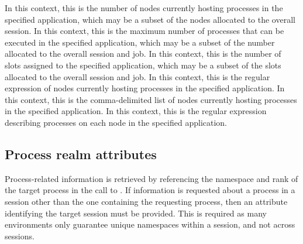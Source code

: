 %
In this context, this is the number of
nodes currently hosting processes in the specified application, which may be a
subset of the nodes allocated to the overall session.
\pasteAttributeItemEnd{}
%
%
%
%
In this context, this is the maximum number of processes that can be executed in the specified application, which may be a subset of the number allocated to the overall session and job.
\pasteAttributeItemEnd{}
%
In this context, this is the number of
slots assigned to the specified application, which may be a subset of the slots
allocated to the overall session and job.
\pasteAttributeItemEnd{}
%
%
In this context, this is the regular expression of nodes currently hosting processes in the specified application.
\pasteAttributeItemEnd{}
%
In this context, this is the comma-delimited list of nodes currently hosting processes in the specified application.
\pasteAttributeItemEnd{}
%
In this context, this is the regular expression describing processes on each node in the specified application.
\pasteAttributeItemEnd{}
%
%

\subsection{Process realm attributes}
\label{chap:res:prealm}

Process-related information is retrieved by referencing the namespace
and rank of the target process in the call to . If information
is requested about a process in a session other than the one containing the
requesting process, then an attribute identifying the target session must be
provided. This is required as many environments only guarantee unique
namespaces within a session, and not across sessions.

